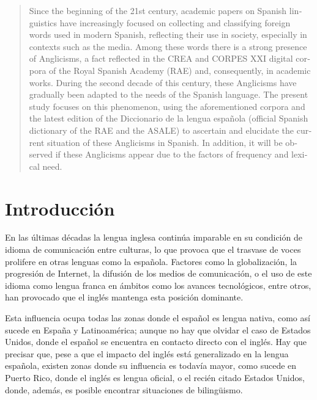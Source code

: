\documentclass{textolivre}
\begin{document}
\begin{polyabstract}
\begin{portuguese}
\begin{abstract}
\end{abstract}
\end{portuguese}

\begin{english}
\begin{abstract}
Since the beginning of the 21st century, academic papers on Spanish linguistics have increasingly focused on collecting and classifying foreign words used in modern Spanish, reflecting their use in society, especially in contexts such as the media. Among these words there is a strong presence of Anglicisms, a fact reflected in the CREA and CORPES XXI digital corpora of the Royal Spanish Academy (RAE) and, consequently, in academic works. During the second decade of this century, these Anglicisms have gradually been adapted to the needs of the Spanish language. The present study focuses on this phenomenon, using the aforementioned corpora and the latest edition of the Diccionario de la lengua española (official Spanish dictionary of the RAE and the ASALE) to ascertain and elucidate the current situation of these Anglicisms in Spanish. In addition, it will be observed if these Anglicisms appear due to the factors of frequency and lexical need.

\end{abstract}
\end{english}

\end{polyabstract}


\section{Introducción}\label{sec-intro}
En las últimas décadas la lengua inglesa continúa imparable en su condición de idioma de comunicación entre culturas, lo que provoca que el trasvase de voces prolifere en otras lenguas como la española. Factores como la globalización, la progresión de Internet, la difusión de los medios de comunicación, o el uso de este idioma como lengua franca en ámbitos como los avances tecnológicos, entre otros, han provocado que el inglés mantenga esta posición dominante.

Esta influencia ocupa todas las zonas donde el español es lengua nativa, como así sucede en España y Latinoamérica; aunque no hay que olvidar el caso de Estados Unidos, donde el español se encuentra en contacto directo con el inglés. Hay que precisar que, pese a que el impacto del inglés está generalizado en la lengua española, existen zonas donde su influencia es todavía mayor, como sucede en Puerto Rico, donde el inglés es lengua oficial, o el recién citado Estados Unidos, donde, además, es posible encontrar situaciones de bilingüismo. 
\end{document}
